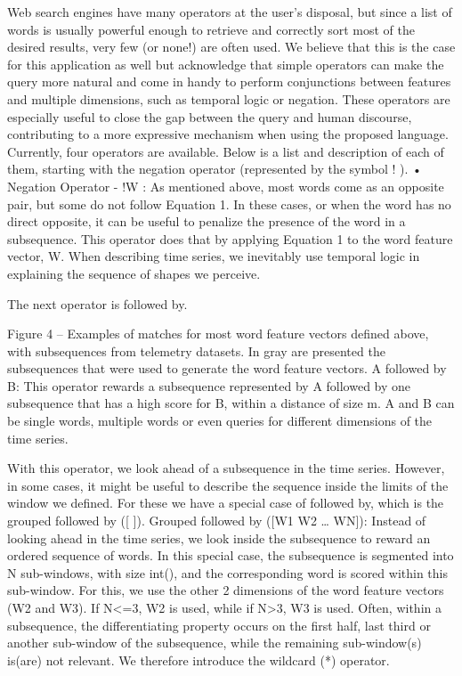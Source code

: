 Web search engines have many operators at the user’s disposal, but since a list of words is usually powerful enough to retrieve and correctly sort most of the desired results, very few (or none!) are often used. We believe that this is the case for this application as well but acknowledge that simple operators can make the query more natural and come in handy to perform conjunctions between features and multiple dimensions, such as temporal logic or negation. These operators are especially useful to close the gap between the query and human discourse, contributing to a more expressive mechanism when using the proposed language. Currently, four operators are available. Below is a list and description of each of them, starting with the negation operator (represented by the symbol  ! ).
•	Negation Operator  - !W : As mentioned above, most words come as an opposite pair, but some do not follow Equation 1. In these cases, or when the word has no direct opposite, it can be useful to penalize the presence of the word in a subsequence. This operator does that by applying Equation 1 to the word feature vector, W. 
When describing time series, we inevitably use temporal logic in explaining the sequence of shapes we perceive. 

The next operator is followed by.
 

Figure 4 – Examples of matches for most word feature vectors defined above, with subsequences from telemetry datasets. In gray are presented the subsequences that were used to generate the word feature vectors.
	A followed by B: This operator rewards a subsequence represented by A followed by one subsequence that has a high score for B, within a distance of size m. A and B can be single words, multiple words or even queries for different dimensions of the time series.

With this operator, we look ahead of a subsequence in the time series. However, in some cases, it might be useful to describe the sequence inside the limits of the window we defined. For these we have a special case of followed by, which is the grouped followed by ([ ]). 
	Grouped followed by ([W1 W2 … WN]): Instead of looking ahead in the time series, we look inside the subsequence to reward an ordered sequence of words. In this special case, the subsequence is segmented into N sub-windows, with size int(), and the corresponding word is scored within this sub-window. For this, we use the other 2 dimensions of the word feature vectors (W2 and W3). If N<=3, W2 is used, while if N>3, W3 is used.
Often, within a subsequence, the differentiating property occurs on the first half, last third or another sub-window of the subsequence, while the remaining sub-window(s) is(are) not relevant. We therefore introduce the wildcard (*) operator.

